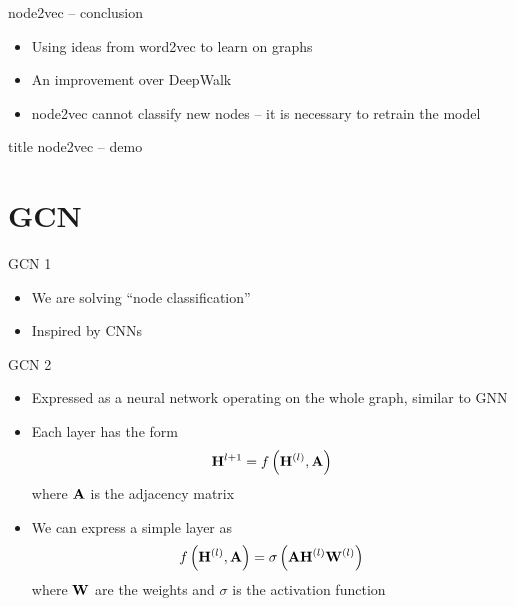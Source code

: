 \documentclass[10pt, aspectratio=169]{beamer}
\newcommand{\mathmat}{\ensuremath{\mathbf}}
\begin{document}
\begin{frame}{node2vec -- conclusion}
	\begin{itemize}
		\item Using ideas from word2vec to learn on graphs
		\item An improvement over DeepWalk
		\item node2vec cannot classify new nodes -- it is necessary to retrain the model
	\end{itemize}
\end{frame}

\begin{frame}
	\begin{beamercolorbox}[sep=8pt,center,rounded=true]{title}
		node2vec -- demo\par%
	\end{beamercolorbox}
\end{frame}

\section{GCN}

\begin{frame}{GCN 1}
	\begin{itemize}
		\item We are solving \enquote{node classification}
		\item Inspired by CNNs
	\end{itemize}
\end{frame}

\begin{frame}{GCN 2}
	\begin{itemize}
		\item Expressed as a neural network operating on the whole graph, similar to GNN
		\item Each layer has the form
			\[ \mathmat{H}^{l + 1} = f \left( \mathmat{H}^{(l)}, \mathmat{A} \right) \]
			where \( \mathmat{A} \) is the adjacency matrix
		\item We can express a simple layer as
			\[ f \left( \mathmat{H}^{(l)}, \mathmat{A} \right) = \sigma \left( \mathmat{A} \mathmat{H}^{(l)} \mathmat{W}^{(l)} \right) \]
			where \( \mathmat{W} \) are the weights and \( \sigma \) is the activation function
	\end{itemize}
\end{frame}
\end{document}
